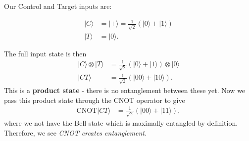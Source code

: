 \documentclass[lasers.tex]{subfiles}
\begin{document}
\begin{example}
    Our Control and Target inputs are:
    \begin{figure}[H]
    \begin{multicols}{2}
        \begin{center}
        \end{center}
    \columnbreak
    \begin{align}
        |C\rangle &= |+\rangle = \frac{1}{\sqrt{2}}\left(|0\rangle+|1\rangle\right) \\
        |T\rangle &= |0\rangle.
    \end{align}
    \end{multicols}
    \end{figure}
    \vspace{-2em}
    The full input state is then
    \begin{align}
        |C\rangle\otimes|T\rangle &= \frac{1}{\sqrt{2}}\left(|0\rangle+|1\rangle\right)\otimes|0\rangle \\
                       |CT\rangle &= \frac{1}{\sqrt{2}}\left(|00\rangle+|10\rangle\right).
    \end{align}
    This is a \textbf{product state} - there is no entanglement between these yet. 
    Now we pass this product state through the CNOT operator to give
    \begin{align}
        \text{CNOT}|CT\rangle &= \frac{1}{\sqrt{2}}\left(|00\rangle+|11\rangle\right),
    \end{align}
    where we not have the Bell state which is maximally entangled by definition. 
    Therefore, we see \textit{CNOT creates entanglement.}


\end{example}
\end{document}
